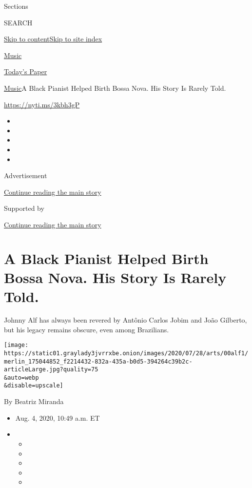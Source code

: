 Sections

SEARCH

\protect\hyperlink{site-content}{Skip to
content}\protect\hyperlink{site-index}{Skip to site index}

\href{https://www.nytimes3xbfgragh.onion/section/arts/music}{Music}

\href{https://myaccount.nytimes3xbfgragh.onion/auth/login?response_type=cookie\&client_id=vi}{}

\href{https://www.nytimes3xbfgragh.onion/section/todayspaper}{Today's
Paper}

\href{/section/arts/music}{Music}\textbar{}A Black Pianist Helped Birth
Bossa Nova. His Story Is Rarely Told.

\url{https://nyti.ms/3kbh3gP}

\begin{itemize}
\item
\item
\item
\item
\item
\end{itemize}

Advertisement

\protect\hyperlink{after-top}{Continue reading the main story}

Supported by

\protect\hyperlink{after-sponsor}{Continue reading the main story}

\hypertarget{a-black-pianist-helped-birth-bossa-nova-his-story-is-rarely-told}{%
\section{A Black Pianist Helped Birth Bossa Nova. His Story Is Rarely
Told.}\label{a-black-pianist-helped-birth-bossa-nova-his-story-is-rarely-told}}

Johnny Alf has always been revered by Antônio Carlos Jobim and João
Gilberto, but his legacy remains obscure, even among Brazilians.

\texttt{[image: https://static01.graylady3jvrrxbe.onion/images/2020/07/28/arts/00alf1/merlin\_175044852\_f2214432-832a-435a-b0d5-394264c39b2c-articleLarge.jpg?quality=75\\\&auto=webp\\\&disable=upscale]}

By Beatriz Miranda

\begin{itemize}
\item
  Aug. 4, 2020, 10:49 a.m. ET
\item
  \begin{itemize}
  \item
  \item
  \item
  \item
  \item
  \end{itemize}
\end{itemize}

